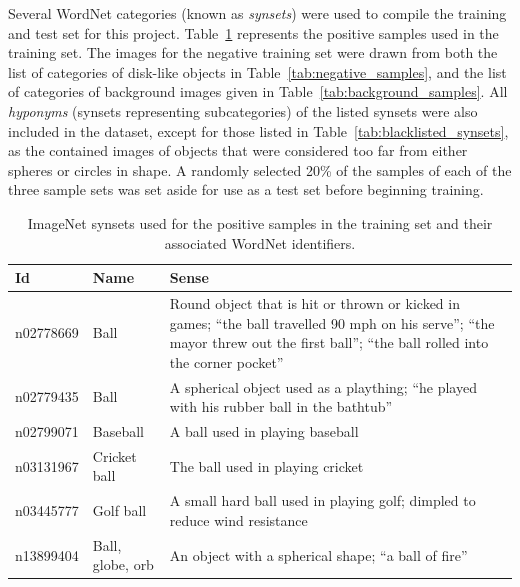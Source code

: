 \documentclass{sig-alternate-05-2015}
\newcommand{\newterm}[1]{{\textit{#1}}}
\begin{document}
{{			Several WordNet categories (known as \newterm{synsets}) were used to compile the training and test set for this project. Table~\ref{tab:positive_samples} represents the positive samples used in the training set. The images for the negative training set were drawn from both the list of categories of disk-like objects in Table~\ref{tab:negative_samples}, and the list of categories of background images given in Table~\ref{tab:background_samples}.
      All \newterm{hyponyms} (synsets representing subcategories) of the listed synsets were also included in the dataset, except for those listed in Table~\ref{tab:blacklisted_synsets}, as the contained images of objects that were considered too far from either spheres or circles in shape.
      A randomly selected 20\% of the samples of each of the three sample sets was set aside for use as a test set before beginning training.


			\begin{table}
				\centering
				\caption{ImageNet synsets used for the positive samples in the training set and their associated WordNet identifiers.}
				\label{tab:positive_samples}
				\begin{tabularx}{\textwidth}{@{}lp{4cm}X@{}}
					\toprule
					\textbf{Id} & \textbf{Name} & \textbf{Sense} \\
					\midrule
						n02778669 & Ball & Round object that is hit or thrown or kicked in games; ``the ball travelled 90 mph on his serve''; ``the mayor threw out the first ball''; ``the ball rolled into the corner pocket'' \\
						n02779435 & Ball & A spherical object used as a plaything; ``he played with his rubber ball in the bathtub'' \\
						n02799071 & Baseball & A ball used in playing baseball \\
						n03131967 & Cricket ball & The ball used in playing cricket \\
						n03445777 & Golf ball & A small hard ball used in playing golf; dimpled to reduce wind resistance \\
						n13899404 & Ball, globe, orb & An object with a spherical shape; ``a ball of fire'' \\
					\bottomrule
				\end{tabularx}
			\end{table}

}}
\end{document}
